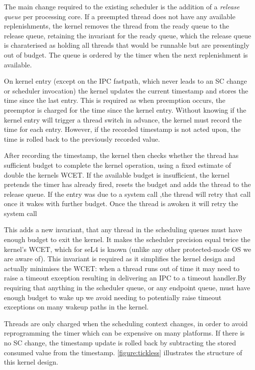 The main change required to the existing scheduler is the addition of a \emph{release queue} per
processing core. If a
preempted thread does not have any available replenishments, the kernel removes the thread from the
ready queue to the release queue, retaining the invariant for the ready queue, which the release
queue is charaterised as holding all threads that would be runnable but are presentingly out of
budget. The queue is ordered by the timer when the next replenishment is available.

On kernel entry (except on the IPC fastpath, which never leads to an SC
change or scheduler invocation) the kernel updates the current
timestamp and stores the time since the last entry. This is required as when preemption occurs, the
preemptor is charged for the time since the kernel entry. Without knowing if the kernel entry will
trigger a thread switch in advance, the kernel must record the time for each entry. However, if the
recorded timestamp is not acted upon, the time is rolled back to the previously recorded value.

After recording the timestamp, the kernel then checks
whether the thread has sufficient budget to complete the kernel
operation, using a fixed estimate of double the kernels \gls{WCET}.
If the available budget is insufficient, the kernel pretends the timer has already fired,
resets the budget and adds the thread to the release queue. If the entry was due to a system call
,the thread will retry that call once it wakes with further budget.
Once the thread is awoken it will retry the system call

This adds a new
invariant, that any thread in the scheduling queues must have enough budget to exit the kernel.
It makes the scheduler precision equal twice the kernel's WCET, which for
seL4 is known (unlike any other protected-mode OS we are aware of).
This invariant is required as it simplifies the kernel design and actually minimises the WCET: when
a
thread runs out of time it may need to raise a timeout exception resulting in delivering an IPC to a
timeout handler.By requiring that anything in the scheduler queue, or any endpoint queue, must have
enough budget to wake up we avoid needing to potentially raise timeout exceptions on many wakeup
paths in the kernel.

Threads are only charged when the scheduling context changes, in order to avoid
reprogramming the timer which can be expensive on many platforms. %
If there is no SC change, the timestamp update is rolled back by subtracting the
stored consumed value from the timestamp.
\autoref{figure:tickless} illustrates the structure of this kernel design.

